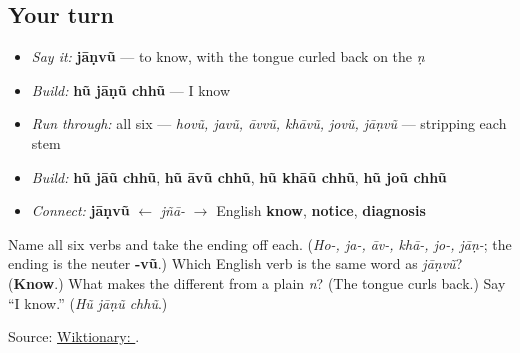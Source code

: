 \subsection*{Your turn}
\begin{itemize}
\raggedright
  \item \emph{Say it:} \textbf{jāṇvũ} — to know, with the tongue curled back on the \emph{ṇ}
  \item \emph{Build:} \textbf{hũ jāṇũ chhũ} — I know
  \item \emph{Run through:} all six — \emph{hovũ, javũ, āvvũ, khāvũ, jovũ, jāṇvũ} — stripping each stem
  \item \emph{Build:} \textbf{hũ jāũ chhũ}, \textbf{hũ āvũ chhũ}, \textbf{hũ khāũ chhũ}, \textbf{hũ joũ chhũ}
  \item \emph{Connect:} \textbf{jāṇvũ} $\leftarrow$ \emph{jñā-} $\to$ English \textbf{know}, \textbf{notice}, \textbf{diagnosis}
\end{itemize}

\begin{tcolorbox}[breakable,colback=teal!4,colframe=teal!35!black,title={Before you move on}]
Name all six verbs and take the ending off each. (\emph{Ho-, ja-, āv-, khā-, jo-, jāṇ-}; the ending is the neuter \textbf{-vũ}.) Which English verb is the same word as \emph{jāṇvũ}? (\textbf{Know}.) What makes the \textbf{} different from a plain \emph{n}? (The tongue curls back.) Say \textquotedblleft{}I know.\textquotedblright{} (\emph{Hũ jāṇũ chhũ}.)

Source: \href{https://en.wiktionary.org/wiki/\%E0\%AA\%9C\%E0\%AA\%BE\%E0\%AA\%A3\%E0\%AA\%B5\%E0\%AB\%81\%E0\%AA\%82}{Wiktionary: }.
\end{tcolorbox}
